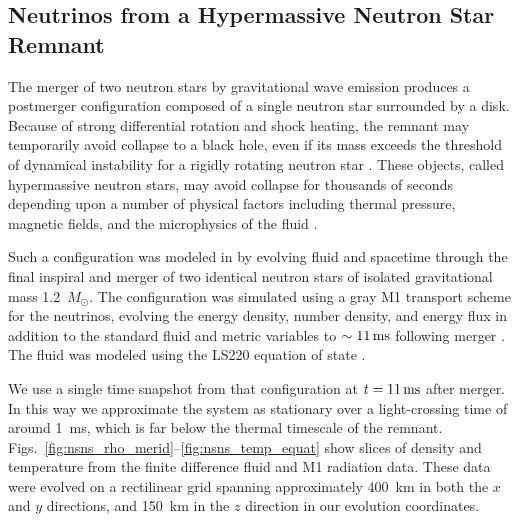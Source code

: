 \documentclass[aps,floatfix,prd,superscriptaddress,twocolumn]{revtex4-1}
\begin{document}
\subsection{Neutrinos from a Hypermassive Neutron Star Remnant}
\label{ssec:test_disk_comparison}
The merger of two neutron stars by gravitational wave emission produces a
postmerger configuration composed of a single neutron star surrounded by a disk.
Because of strong differential rotation and shock heating,
the remnant may temporarily avoid collapse to a black hole,
even if its mass exceeds the threshold of dynamical
instability for a rigidly rotating neutron star \cite{duez2009-review}.
These objects, called hypermassive neutron stars,
may avoid collapse for thousands of seconds
depending upon a number of physical factors including thermal pressure,
magnetic fields, and the microphysics of the fluid
\cite{rezz2015-two_winds,ravi2014-hmns_collapse}.

Such a configuration was modeled in \cite{fouc2016-m1_nsns} by
evolving fluid and spacetime through the
final inspiral and merger of two identical neutron stars of
isolated gravitational mass 1.2~$M_{\odot}$. The configuration
was simulated using a gray M1 transport scheme for the neutrinos, evolving the
energy density, number density, and energy flux in addition to the standard
fluid and metric variables to $\sim11\,{\rm ms}$ following merger
\cite{fouc2016-m1_evolve_n}.
The fluid was modeled using the LS220 equation of state \cite{latt1991-nuc_eos}.

We use a single time snapshot from that configuration
at $t=11\,{\rm ms}$ after merger.
In this way we approximate the system as stationary over a light-crossing time
of around 1~ms, which is far below the thermal timescale of the remnant.
Figs.~\ref{fig:nsns_rho_merid}--\ref{fig:nsns_temp_equat}
show slices of density and temperature from the finite difference
fluid and M1 radiation data.
These data were evolved on a rectilinear grid spanning approximately 400~km in
both the $x$ and $y$ directions, and 150~km in the $z$ direction in our
evolution coordinates.
\end{document}
